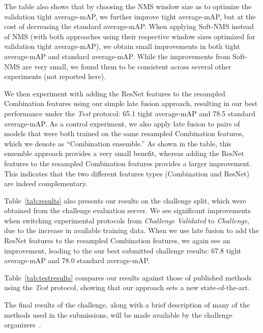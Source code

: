 \documentclass[10pt,twocolumn,letterpaper]{article}
\begin{document}
The table also shows that by choosing the NMS window size as to optimize the validation tight average-mAP, we further improve tight average-mAP, but at the cost of decreasing the standard average-mAP. When applying Soft-NMS instead of NMS (with both approaches using their respective window sizes optimized for validation tight average-mAP), we obtain small improvements in both tight average-mAP and standard average-mAP. While the improvements from Soft-NMS are very small, we found them to be consistent across several other experiments (not reported here).

We then experiment with adding the ResNet features to the resampled Combination features using our simple late fusion approach, resulting in our best performance under the {\it Test} protocol: 65.1 tight average-mAP and 78.5 standard average-mAP. As a control experiment, we also apply late fusion to pairs of models that were both trained on the same resampled Combination features, which we denote as ``Combination ensemble.'' As shown in the table, this ensemble approach provides a very small benefit, whereas adding the ResNet features to the resampled Combination features provides a larger improvement. This indicates that the two different features types (Combination and ResNet) are indeed complementary.

Table~\ref{tab:results} also presents our results on the challenge split, which were obtained from the challenge evaluation server. We see significant improvements when switching experimental protocols from {\it Challenge Validated} to {\it Challenge}, due to the increase in available training data. When we use late fusion to add the ResNet features to the resampled Combination features, we again see an improvement, leading to the our best submitted challenge results: 67.8 tight average-mAP and 78.0 standard average-mAP.

Table~\ref{tab:testresults} compares our results against those of published methods using the {\it Test} protocol, showing that our approach sets a new state-of-the-art.

The final results of the challenge, along with a brief description of many of the methods used in the submissions, will be made available by the challenge organizers~\cite{mmsports, spottingchallenge}.
\end{document}
